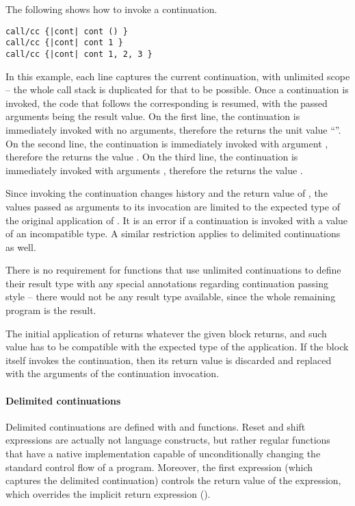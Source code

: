 \example The following shows how to invoke a continuation. 
\begin{lstlisting}
call/cc {|cont| cont () }
call/cc {|cont| cont 1 }
call/cc {|cont| cont 1, 2, 3 }
\end{lstlisting}
In this example, each line captures the current continuation, with unlimited scope -- the whole call stack is duplicated for that to be possible. Once a continuation is invoked, the code that follows the corresponding  is resumed, with the passed arguments being the result value. On the first line, the continuation is immediately invoked with no arguments, therefore the  returns the unit value ``\code{()}''. On the second line, the continuation is immediately invoked with argument , therefore the  returns the value . On the third line, the continuation is immediately invoked with arguments , therefore the  returns the value . 

Since invoking the continuation changes history and the return value of , the values passed as arguments to its invocation are limited to the expected type of the original application of . It is an error if a continuation is invoked with a value of an incompatible type. A similar restriction applies to delimited continuations as well. 

There is no requirement for functions that use unlimited continuations to define their result type with any special annotations regarding continuation passing style -- there would not be any result type available, since the whole remaining program is the result. 

The initial application of  returns whatever the given block returns, and such value has to be compatible with the expected type of the  application. If the block itself invokes the continuation, then its return value is discarded and replaced with the arguments of the continuation invocation. 







\paragraph{Delimited continuations}

Delimited continuations are defined with  and  functions. Reset and shift expressions are actually not language constructs, but rather regular functions that have a native implementation capable of unconditionally changing the standard control flow of a program. Moreover, the first  expression (which captures the delimited continuation) controls the return value of the  expression, which overrides the implicit return expression ().

